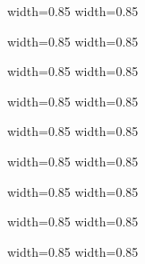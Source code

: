 \begin{frame}
      {width=0.85\textwidth} {}
      {width=0.85\textwidth} {}
\end{frame}
\begin{frame}
      {width=0.85\textwidth} {}
      {width=0.85\textwidth} {}
\end{frame}
\begin{frame}
      {width=0.85\textwidth} {}
      {width=0.85\textwidth} {}
\end{frame}
\begin{frame}
      {width=0.85\textwidth} {}
      {width=0.85\textwidth} {}
\end{frame}
\begin{frame}
      {width=0.85\textwidth} {}
      {width=0.85\textwidth} {}
\end{frame}
\begin{frame}
      {width=0.85\textwidth} {}
      {width=0.85\textwidth} {}
\end{frame}
\begin{frame}
      {width=0.85\textwidth} {}
      {width=0.85\textwidth} {}
\end{frame}
\begin{frame}
      {width=0.85\textwidth} {}
      {width=0.85\textwidth} {}
\end{frame}
\begin{frame}
      {width=0.85\textwidth} {}
      {width=0.85\textwidth} {}
\end{frame}
